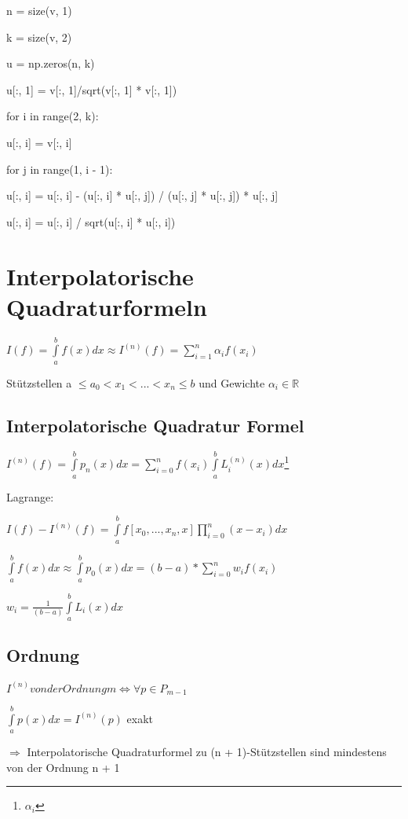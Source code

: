 \documentclass[12pt,a4paper]{article} %
\newcommand*\tab[1][1cm]{\hspace*{#1}}
\begin{document}
	n = size(v, 1)
	
	k = size(v, 2)
	
	u = np.zeros(n, k)
	
	u[:, 1] = v[:, 1]/sqrt(v[:, 1] * v[:, 1])
	
	for i in range(2, k):
	
	\tab u[:, i] = v[:, i]
	
	\tab for j in range(1, i - 1):
	
	\tab \tab u[:, i] = u[:, i] - (u[:, i] * u[:, j]) / (u[:, j] * u[:, j]) * u[:, j]
	
	\tab u[:, i] = u[:, i] / sqrt(u[:, i] * u[:, i])
	
	\newpage
	
	\section{Interpolatorische Quadraturformeln}
	
	$I(f) = \int\limits_{a}^{b}f(x)dx \approx I^{(n)}(f) = \sum\limits_{i = 1}^{n}\alpha_if(x_i)$
	
	Stützstellen a $\le a_0 < x_1 < ... < x_n \le b$ und Gewichte $\alpha_i \in \mathbb{R}$
	
	\subsection{Interpolatorische Quadratur Formel}
	
	$I^{(n)}(f) = \int\limits_{a}^{b}p_n(x)dx = \sum\limits_{i = 0}^nf(x_i)\int\limits_a^bL_i^{(n)}(x)dx$\footnote{$\alpha_i$}
	
	Lagrange:
	
	$I(f) - I^{(n)}(f) = \int\limits_a^bf[x_0, ..., x_n, x] \prod\limits_{i = 0}^n(x - x_i)dx$
	
	$\int\limits_a^bf(x)dx \approx \int\limits_a^bp_0(x)dx = (b - a) * \sum\limits_{i = 0}^nw_if(x_i)$
	
	$w_i = \frac{1}{(b - a)} \int\limits_a^bL_i(x)dx$
	
	\subsection{Ordnung}
	
	$I^{(n)}von der Ordnung m \Leftrightarrow \forall p \in P_{m - 1}$
	
	$\int\limits_a^bp(x)dx = I^{(n)}(p)$ \tab exakt
	
	$\Rightarrow$ Interpolatorische Quadraturformel zu (n + 1)-Stützstellen sind mindestens von der Ordnung n + 1
	
\end{document}
